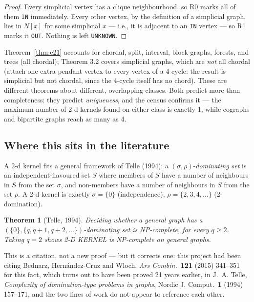 \documentclass[11pt]{article}
\theoremstyle{plain}
\newtheorem{theorem}{Theorem}[section]
\theoremstyle{definition}
\theoremstyle{remark}
\begin{document}
\begin{proof}
Every simplicial vertex has a clique neighbourhood, so R0 marks all of them
\texttt{IN} immediately. Every other vertex, by the definition of a simplicial graph,
lies in $N[x]$ for some simplicial $x$ — i.e., it is adjacent to an \texttt{IN} vertex
— so R1 marks it \texttt{OUT}. Nothing is left \texttt{UNKNOWN}.
\end{proof}

Theorem~\ref{thm:e21} accounts for chordal, split, interval, block graphs, forests,
and trees (all chordal); Theorem 3.2 covers simplicial graphs, which are \emph{not}
all chordal (attach one extra pendant vertex to every vertex of a 4-cycle: the result
is simplicial but not chordal, since the 4-cycle itself has no chord). These are
different theorems about different, overlapping classes. Both predict more than
completeness: they predict \emph{uniqueness}, and the census confirms it — the
maximum number of 2-d kernels found on either class is exactly 1, while cographs and
bipartite graphs reach as many as 4.

\subsection{Where this sits in the literature}
\label{sec:literature}

A 2-d kernel fits a general framework of Telle (1994): a $(\sigma,\rho)$-\emph{dominating
set} is an independent-flavoured set $S$ where members of $S$ have a number of
neighbours in $S$ from the set $\sigma$, and non-members have a number of neighbours
in $S$ from the set $\rho$. A 2-d kernel is exactly $\sigma = \{0\}$ (independence),
$\rho = \{2,3,4,\dots\}$ (2-domination).

\begin{theorem}[Telle, 1994]
\label{thm:telle}
Deciding whether a general graph has a $(\{0\}, \{q, q{+}1, q{+}2, \dots\})$-dominating
set is NP-complete, for every $q \ge 2$. Taking $q = 2$ shows 2-D KERNEL is NP-complete
on general graphs.
\end{theorem}

This is a citation, not a new proof — but it corrects one: this project had been
citing Bednarz, Hern\'andez-Cruz and Wloch, \emph{Ars Combin.}\ \textbf{121} (2015)
341--351 for this fact, which turns out to have been proved 21 years earlier, in J.~A.
Telle, \emph{Complexity of domination-type problems in graphs}, Nordic J. Comput.\
\textbf{1} (1994) 157--171, and the two lines of work do not appear to reference each
other.
\end{document}
